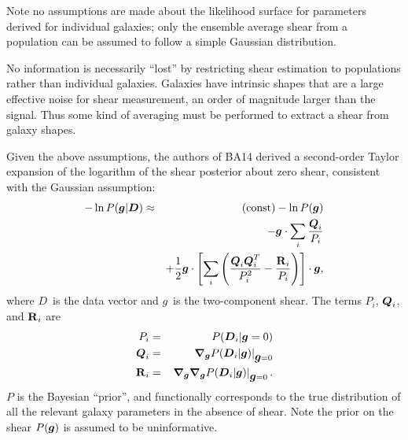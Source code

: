 \documentclass[usegraphicx,usenatbib]{mn2e}
\newcommand{\sn}{$S/N$}
\newcommand{\vecg}{\mbox{\boldmath $g$}}
\newcommand{\vecD}{\mbox{\boldmath $D$}}
\newcommand{\vecQ}{\mbox{\boldmath $Q$}}
\newcommand{\matR}{\mbox{$\bf R$}}
\newcommand{\bnabg}{ \boldsymbol{\nabla_g}}
\begin{document}
Note no assumptions are made about the likelihood surface for parameters
derived for individual galaxies; only the ensemble average shear from a
population can be assumed to follow a simple Gaussian distribution.

No information is necessarily ``lost'' by restricting shear estimation to
populations rather than individual galaxies.  
Galaxies have intrinsic shapes that are a large effective noise for shear
measurement, an order of magnitude larger than the signal.  Thus some kind of
averaging must be performed to extract a shear from galaxy shapes.  


Given the above assumptions, the authors of BA14 derived a second-order Taylor
expansion of the logarithm of the shear posterior about zero shear, consistent
with the Gaussian assumption:
\begin{eqnarray} \label{eq:pexpand}
    -\ln P(\vecg | \vecD) & \approx & {(\rm const)} - \ln P(\vecg) \nonumber \\
                          & & - \vecg \cdot \sum_i \frac{\vecQ_i}{P_i} \\
    & &
    + \frac{1}{2} \vecg \cdot \left[ \sum_i \left(\frac{\vecQ_i \vecQ^T_i}{P_i^2}
    - \frac{\matR_i}{P_i}\right) \right] \cdot \vecg, \nonumber
\end{eqnarray}
where \vecD\ is the data vector and \vecg\ is the two-component shear.  The
terms $P_i$, $\vecQ_i$, and $\matR_i$ are 
\begin{eqnarray} \label{eq:pqrdef}
P_i     & = & P(\vecD_i | \vecg=0) \nonumber \\
\vecQ_i & = & \left. \bnabg P(\vecD_i | \vecg)\right|_{\vecg=0} \\
\matR_i & = & \left. \bnabg \bnabg P(\vecD_i | \vecg)\right|_{\vecg=0}. \nonumber
\end{eqnarray}
$P$ is the Bayesian ``prior'', and functionally corresponds to the true
distribution of all the relevant galaxy parameters in the absence of shear.
Note the prior on the shear $P(\vecg)$ is assumed to be uninformative.
\end{document}
